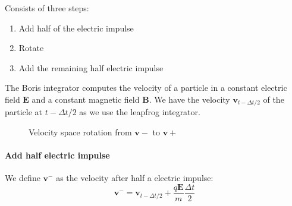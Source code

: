 \documentclass[a5paper,12pt,landscape]{report}
\newcommand*\V[1]{\bm{#1}}
\newcommand{\E}{\V{E}}
\newcommand{\B}{\V{B}}
\renewcommand*{\v}{\V{v}}
\newcommand{\dt}{\Delta t}
\begin{document}
Consists of three steps:
%
\begin{enumerate}
\item Add half of the electric impulse
\item Rotate
\item Add the remaining half electric impulse
\end{enumerate}
%
The Boris integrator computes the velocity of a particle in a constant electric 
field $\E$ and a constant magnetic field $\B$. We have the velocity 
$\v_{t-\Delta t/2}$ of the particle at $t-\Delta t/2$ as we use the leapfrog 
integrator.
%
\begin{figure}[h]
\centering
{}
\caption{Velocity space rotation from $\v-$ to $\v+$}
\end{figure}
%
\paragraph{Add half electric impulse} We define $\V{v^-}$ as the velocity after 
half a electric impulse:
$$\v^- = \v_{t-\dt/2} + \frac{q \E}{m} \frac{\dt}{2}$$
\end{document}
